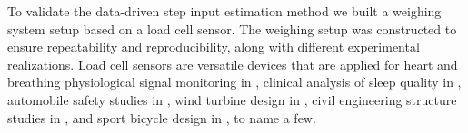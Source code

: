 To validate the data-driven step input estimation method we built a weighing system setup based on a load cell sensor.
The weighing setup was constructed to ensure repeatability and reproducibility, along with different experimental realizations.
Load cell sensors are versatile devices that are applied for
heart and breathing physiological signal monitoring in \citet{Lee16},
clinical analysis of sleep quality in \citet{Zahradka18},
automobile safety studies in \citet{Ballo16},
wind turbine design in \citet{Rossander15}, 
civil engineering structure studies in \citet{Olmi16}, and 
sport bicycle design in \citet{Casas16}, to name a few.

